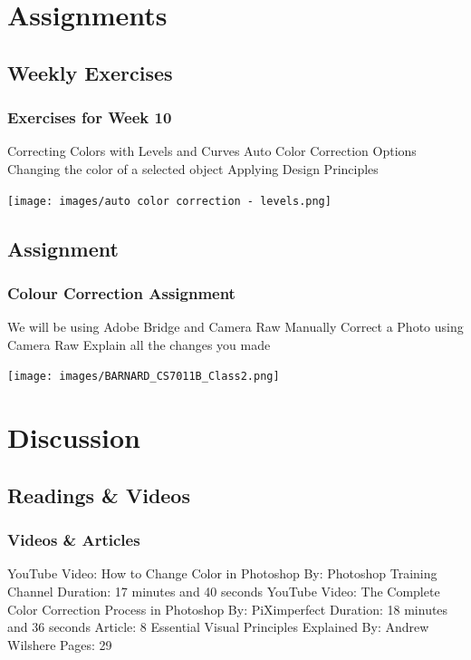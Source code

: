 \documentclass{beamer}
\begin{document}
		\section{Assignments}
			\subsection{Weekly Exercises}		
			\begin{frame}
				\frametitle{Exercises for Week 10}
				\begin{outline}
					\1 Correcting Colors with Levels and Curves
					\1 Auto Color Correction Options
					\1 Changing the color of a selected object
					\1 Applying Design Principles
				\end{outline}
				\texttt{[image: images/auto color correction - levels.png]}
			\end{frame}
		
		\subsection{Assignment}		
			\begin{frame}
				\frametitle{Colour Correction Assignment}
				\begin{outline}
					\1 We will be using Adobe Bridge and Camera Raw
					\1 Manually Correct a Photo using Camera Raw
					\1 Explain all the changes you made
				\end{outline}
			\texttt{[image: images/BARNARD\_CS7011B\_Class2.png]}
			\end{frame}
	
		\section{Discussion}
			\subsection{Readings \& Videos}		
				\begin{frame}
					\frametitle{Videos \& Articles}
					\begin{outline}
						\1 YouTube Video:  How to Change Color in Photoshop
							\2 By:  Photoshop Training Channel
							\2 Duration:  17 minutes and 40 seconds
						\1 YouTube Video:  The Complete Color Correction Process in Photoshop
							\2 By:  PiXimperfect
							\2 Duration:  18 minutes and 36 seconds
						\1 Article:  8 Essential Visual Principles Explained
							\2 By:  Andrew Wilshere
							\2 Pages:  29
					\end{outline}
					
				\end{frame}
\end{document}
